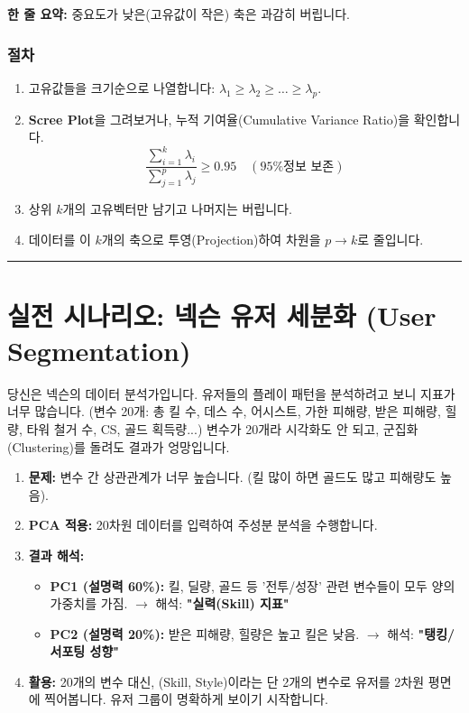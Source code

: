 \documentclass[11pt,a4paper]{book}
\theoremstyle{definition}
\begin{document}
\begin{conceptbox}[title={개념 4: 정보의 압축}]
\textbf{한 줄 요약:} 중요도가 낮은(고유값이 작은) 축은 과감히 버립니다.
\end{conceptbox}

\subsubsection*{절차}
\begin{enumerate}
    \item 고유값들을 크기순으로 나열합니다: $\lambda_1 \ge \lambda_2 \ge \dots \ge \lambda_p$.
    \item \textbf{Scree Plot}을 그려보거나, 누적 기여율(Cumulative Variance Ratio)을 확인합니다.
    $$ \frac{\sum_{i=1}^k \lambda_i}{\sum_{j=1}^p \lambda_j} \ge 0.95 \quad (\text{95\% 정보 보존}) $$
    \item 상위 $k$개의 고유벡터만 남기고 나머지는 버립니다.
    \item 데이터를 이 $k$개의 축으로 투영(Projection)하여 차원을 $p \to k$로 줄입니다.
\end{enumerate}

\vspace{0.5cm}\hrule\vspace{0.5cm}

\section{실전 시나리오: 넥슨 유저 세분화 (User Segmentation)}

\begin{storybox}[title={Scenario: 너무 많은 게임 지표들}]
당신은 넥슨의 데이터 분석가입니다. 유저들의 플레이 패턴을 분석하려고 보니 지표가 너무 많습니다.
(변수 20개: 총 킬 수, 데스 수, 어시스트, 가한 피해량, 받은 피해량, 힐량, 타워 철거 수, CS, 골드 획득량...)
변수가 20개라 시각화도 안 되고, 군집화(Clustering)를 돌려도 결과가 엉망입니다.
\end{storybox}

\begin{enumerate}
    \item \textbf{문제:} 변수 간 상관관계가 너무 높습니다. (킬 많이 하면 골드도 많고 피해량도 높음).
    \item \textbf{PCA 적용:} 20차원 데이터를 입력하여 주성분 분석을 수행합니다.
    \item \textbf{결과 해석:}
    \begin{itemize}
        \item \textbf{PC1 (설명력 60\%):} 킬, 딜량, 골드 등 '전투/성장' 관련 변수들이 모두 양의 가중치를 가짐. $\rightarrow$ 해석: \textbf{"실력(Skill) 지표"}
        \item \textbf{PC2 (설명력 20\%):} 받은 피해량, 힐량은 높고 킬은 낮음. $\rightarrow$ 해석: \textbf{"탱킹/서포팅 성향"}
    \end{itemize}
    \item \textbf{활용:} 20개의 변수 대신, (Skill, Style)이라는 단 2개의 변수로 유저를 2차원 평면에 찍어봅니다. 유저 그룹이 명확하게 보이기 시작합니다.
\end{enumerate}
\end{document}
